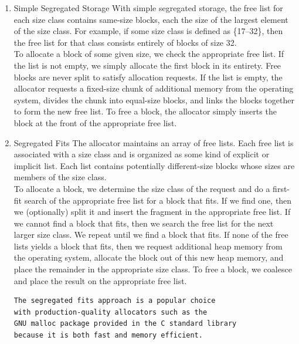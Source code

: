 \documentclass[11pt]{article}
\begin{document}
\begin{enumerate}
\item Simple Segregated Storage
\label{sec:org90aa51e}
With simple segregated storage, the free list for each size class contains same-size blocks, each the size of the largest element of the size class. For example, if some size class is defined as \{17–32\}, then the free list for that class consists entirely of blocks of size 32.\\

To allocate a block of some given size, we check the appropriate free list. If the list is not empty, we simply allocate the first block in its entirety. Free blocks are never split to satisfy allocation requests. If the list is empty, the allocator requests a fixed-size chunk of additional memory from the operating system, divides the chunk into equal-size blocks, and links the blocks together to form the new free list. To free a block, the allocator simply inserts the block at the front of the appropriate free list.\\

\item Segregated Fits
\label{sec:org8b6c12a}
The allocator maintains an array of free lists. Each free list is associated with a size class and is organized as some kind of explicit or implicit list. Each list contains potentially different-size blocks whose sizes are members of the size class.\\


To allocate a block, we determine the size class of the request and do a first-fit search of the appropriate free list for a block that fits. If we find one, then we (optionally) split it and insert the fragment in the appropriate free list. If we cannot find a block that fits, then we search the free list for the next larger size class. We repeat until we find a block that fits. If none of the free lists yields a block that fits, then we request additional heap memory from the operating system, allocate the block out of this new heap memory, and place the remainder in the appropriate size class. To free a block, we coalesce and place the result on the appropriate free list.\\


\begin{verbatim}
The segregated fits approach is a popular choice 
with production-quality allocators such as the 
GNU malloc package provided in the C standard library 
because it is both fast and memory efficient. 


\end{verbatim}
\end{enumerate}
\end{document}
